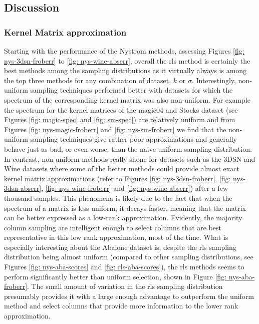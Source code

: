 \subsection{Discussion}\label{Section5.3}

\subsubsection{Kernel Matrix approximation}\label{Section5.3.1}

Starting with the performance of the Nystrom methods, assessing Figures \ref{fig: nys-3dsn-froberr} to \ref{fig: nys-wine-abserr}, overall the rls method is certainly the best methods among the sampling distributions as it virtually always is among the top three methods for any combination of dataset, $k$ or $\sigma$. Interestingly, non-uniform sampling techniques performed better with datasets for which the spectrum of the corresponding kernel matrix was also non-uniform. For example the spectrum for the kernel matrices of the magic04 and Stocks dataset (see Figures \ref{fig: magic-spec} and \ref{fig: sm-spec}) are relatively uniform and from Figures \ref{fig: nys-magic-froberr} and \ref{fig: nys-sm-froberr} we find that the non-uniform sampling techniques give rather poor approximations and generally behave just as bad, or even worse, than the naive uniform sampling distribution. In contrast, non-uniform methods really shone for datasets such as the 3DSN and Wine datasets where some of the better methods could provide almost exact kernel matrix approximations (refer to Figures \ref{fig: nys-3dsn-froberr}, \ref{fig: nys-3dsn-abserr}, \ref{fig: nys-wine-froberr} and \ref{fig: nys-wine-abserr}) after a few thousand samples. This phenomena is likely due to the fact that when the spectrum of a matrix is less uniform, it decays faster, meaning that the matrix can be better expressed as a low-rank approximation. Evidently, the majority column sampling are intelligent enough to select columns that are best representative in this low rank approximation, most of the time. What is especially interesting about the Abalone dataset is, despite the rls sampling distribution being almost uniform (compared to other sampling distributions, see Figures \ref{fig: nys-aba-scores} and \ref{fig: rls-aba-scores}), the rls methods seems to perform significantly better than uniform selection, shown in Figure \ref{fig: nys-aba-froberr}. The small amount of variation in the rls sampling distribution presumably provides it with a large enough advantage to outperform the uniform method and select columns that provide more information to the lower rank approximation.

